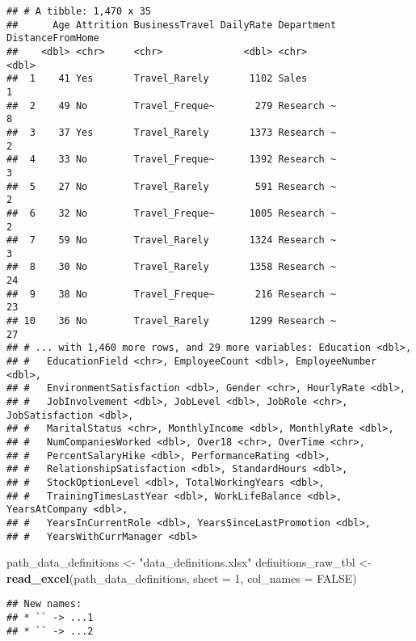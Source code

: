\documentclass[
]{article}
\newenvironment{Shaded}{\begin{snugshade}}{\end{snugshade}}
\newcommand{\DataTypeTok}[1]{\textcolor[rgb]{0.13,0.29,0.53}{#1}}
\newcommand{\DecValTok}[1]{\textcolor[rgb]{0.00,0.00,0.81}{#1}}
\newcommand{\KeywordTok}[1]{\textcolor[rgb]{0.13,0.29,0.53}{\textbf{#1}}}
\newcommand{\NormalTok}[1]{#1}
\newcommand{\OtherTok}[1]{\textcolor[rgb]{0.56,0.35,0.01}{#1}}
\newcommand{\StringTok}[1]{\textcolor[rgb]{0.31,0.60,0.02}{#1}}
\begin{document}
\begin{verbatim}
## # A tibble: 1,470 x 35
##      Age Attrition BusinessTravel DailyRate Department DistanceFromHome
##    <dbl> <chr>     <chr>              <dbl> <chr>                 <dbl>
##  1    41 Yes       Travel_Rarely       1102 Sales                     1
##  2    49 No        Travel_Freque~       279 Research ~                8
##  3    37 Yes       Travel_Rarely       1373 Research ~                2
##  4    33 No        Travel_Freque~      1392 Research ~                3
##  5    27 No        Travel_Rarely        591 Research ~                2
##  6    32 No        Travel_Freque~      1005 Research ~                2
##  7    59 No        Travel_Rarely       1324 Research ~                3
##  8    30 No        Travel_Rarely       1358 Research ~               24
##  9    38 No        Travel_Freque~       216 Research ~               23
## 10    36 No        Travel_Rarely       1299 Research ~               27
## # ... with 1,460 more rows, and 29 more variables: Education <dbl>,
## #   EducationField <chr>, EmployeeCount <dbl>, EmployeeNumber <dbl>,
## #   EnvironmentSatisfaction <dbl>, Gender <chr>, HourlyRate <dbl>,
## #   JobInvolvement <dbl>, JobLevel <dbl>, JobRole <chr>, JobSatisfaction <dbl>,
## #   MaritalStatus <chr>, MonthlyIncome <dbl>, MonthlyRate <dbl>,
## #   NumCompaniesWorked <dbl>, Over18 <chr>, OverTime <chr>,
## #   PercentSalaryHike <dbl>, PerformanceRating <dbl>,
## #   RelationshipSatisfaction <dbl>, StandardHours <dbl>,
## #   StockOptionLevel <dbl>, TotalWorkingYears <dbl>,
## #   TrainingTimesLastYear <dbl>, WorkLifeBalance <dbl>, YearsAtCompany <dbl>,
## #   YearsInCurrentRole <dbl>, YearsSinceLastPromotion <dbl>,
## #   YearsWithCurrManager <dbl>
\end{verbatim}

\begin{Shaded}
\begin{Highlighting}[]
\NormalTok{path_data_definitions <-}\StringTok{ "data_definitions.xlsx"}
\NormalTok{definitions_raw_tbl   <-}\StringTok{ }\KeywordTok{read_excel}\NormalTok{(path_data_definitions, }\DataTypeTok{sheet =} \DecValTok{1}\NormalTok{, }\DataTypeTok{col_names =} \OtherTok{FALSE}\NormalTok{)}
\end{Highlighting}
\end{Shaded}

\begin{verbatim}
## New names:
## * `` -> ...1
## * `` -> ...2
\end{verbatim}
\end{document}
